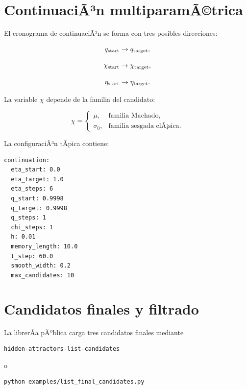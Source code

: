 \documentclass[11pt]{article}
\begin{document}
\section{ContinuaciÃ³n multiparamÃ©trica}

El cronograma de continuaciÃ³n se forma con tres posibles direcciones:

\begin{equation}
q_{\rm start}\to q_{\rm target},
\end{equation}

\begin{equation}
\chi_{\rm start}\to \chi_{\rm target},
\end{equation}

\begin{equation}
\eta_{\rm start}\to \eta_{\rm target}.
\end{equation}

La variable \(\chi\) depende de la familia del candidato:

\begin{equation}
\chi=
\begin{cases}
\mu,&\text{familia Machado},\\
\sigma_0,&\text{familia sesgada clÃ¡sica}.
\end{cases}
\end{equation}

La configuraciÃ³n tÃ­pica contiene:

\begin{lstlisting}
continuation:
  eta_start: 0.0
  eta_target: 1.0
  eta_steps: 6
  q_start: 0.9998
  q_target: 0.9998
  q_steps: 1
  chi_steps: 1
  h: 0.01
  memory_length: 10.0
  t_step: 60.0
  smooth_width: 0.2
  max_candidates: 10
\end{lstlisting}

\section{Candidatos finales y filtrado}

La librerÃ­a pÃºblica carga tres candidatos finales mediante

\begin{lstlisting}
hidden-attractors-list-candidates
\end{lstlisting}

o

\begin{lstlisting}
python examples/list_final_candidates.py
\end{lstlisting}
\end{document}
